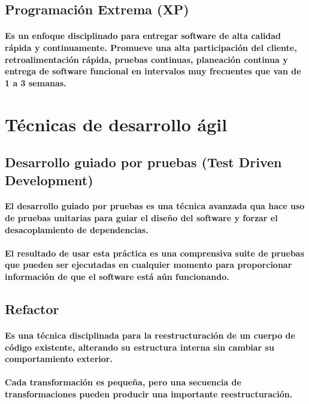  \subsection{Programación Extrema (XP)}
  \paragraph{Es un enfoque disciplinado para entregar software de alta calidad rápida y continuamente. Promueve una alta participación del cliente, retroalimentación rápida, pruebas continuas, planeación continua y entrega de software funcional en intervalos muy frecuentes que van de 1 a 3 semanas.}\cite{24}
  
\section{Técnicas de desarrollo ágil}

\subsection{Desarrollo guiado por pruebas (Test Driven Development)}

  \paragraph{El desarrollo guiado por pruebas es una técnica avanzada qua hace uso de pruebas unitarias para guiar el diseño del software y forzar el desacoplamiento de dependencias.}
  \paragraph{El resultado de usar esta práctica es una comprensiva suite de pruebas que pueden ser ejecutadas en cualquier momento para proporcionar información de que el software está aún funcionando.}\cite{25}

\subsection{Refactor}
  \paragraph{Es una técnica disciplinada para la reestructuración de un cuerpo de código existente, alterando su estructura interna sin cambiar su comportamiento exterior.}
  \paragraph{Cada transformación es pequeña, pero una secuencia de transformaciones pueden producir una importante reestructuración.}\cite{26}

